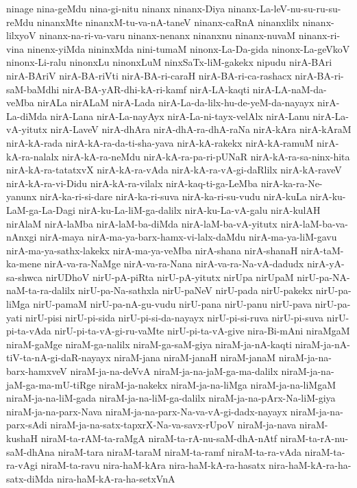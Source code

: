 {ninage
nina-geMdu
nina-gi-nitu
ninanx
ninanx-Diya
ninanx-La-leV-nu-su-ru-su-reMdu
ninanxMte
ninanxM-tu-va-nA-taneV
ninanx-caRnA
ninanxlilx
ninanx-lilxyoV
ninanx-na-ri-va-varu
ninanx-nenanx
ninanxnu
ninanx-nuvaM
ninanx-ri-vina
ninenx-yiMda
nininxMda
nini-tumaM
ninonx-La-Da-gida
ninonx-La-geVkoV
ninonx-Li-ralu
ninonxLu
ninonxLuM
ninxSaTx-liM-gakekx
nipudu
nirA-BAri
nirA-BAriV
nirA-BA-riVti
nirA-BA-ri-caraH
nirA-BA-ri-ca-rashacx
nirA-BA-ri-saM-baMdhi
nirA-BA-yAR-dhi-kA-ri-kamf
nirA-LA-kaqti
nirA-LA-naM-da-veMba
nirALa
nirALaM
nirA-Lada
nirA-La-da-lilx-hu-de-yeM-da-nayayx
nirA-La-diMda
nirA-Lana
nirA-La-nayAyx
nirA-La-ni-tayx-velAlx
nirA-Lanu
nirA-La-vA-yitutx
nirA-LaveV
nirA-dhAra
nirA-dhA-ra-dhA-raNa
nirA-kAra
nirA-kAraM
nirA-kA-rada
nirA-kA-ra-da-ti-sha-yava
nirA-kA-rakekx
nirA-kA-ramuM
nirA-kA-ra-nalalx
nirA-kA-ra-neMdu
nirA-kA-ra-pa-ri-pUNaR
nirA-kA-ra-sa-ninx-hita
nirA-kA-ra-tatatxvX
nirA-kA-ra-vAda
nirA-kA-ra-vA-gi-daRlilx
nirA-kA-raveV
nirA-kA-ra-vi-Didu
nirA-kA-ra-vilalx
nirA-kaq-ti-ga-LeMba
nirA-ka-ra-Ne-yanunx
nirA-ka-ri-si-dare
nirA-ka-ri-suva
nirA-ka-ri-su-vudu
nirA-kuLa
nirA-ku-LaM-ga-La-Dagi
nirA-ku-La-liM-ga-dalilx
nirA-ku-La-vA-galu
nirA-kulAH
nirAlaM
nirA-laMba
nirA-laM-ba-diMda
nirA-laM-ba-vA-yitutx
nirA-laM-ba-va-nAnxgi
nirA-maya
nirA-ma-ya-barx-hamx-vi-lalx-daMdu
nirA-ma-ya-liM-gavu
nirA-ma-ya-sathx-lakekx
nirA-ma-ya-veMba
nirA-shana
nirA-shanaH
nirA-taM-ka-mene
nirA-va-ra-NaMge
nirA-va-ra-Nana
nirA-va-ra-Na-vA-dadudx
nirA-yA-sa-shwca
nirUDhoV
nirU-pA-piRta
nirU-pA-yitutx
nirUpa
nirUpaM
nirU-pa-NA-naM-ta-ra-dalilx
nirU-pa-Na-sathxla
nirU-paNeV
nirU-pada
nirU-pakekx
nirU-pa-liMga
nirU-pamaM
nirU-pa-nA-gu-vudu
nirU-pana
nirU-panu
nirU-pava
nirU-pa-yati
nirU-pisi
nirU-pi-sida
nirU-pi-si-da-nayayx
nirU-pi-si-ruva
nirU-pi-suva
nirU-pi-ta-vAda
nirU-pi-ta-vA-gi-ru-vaMte
nirU-pi-ta-vA-give
nira-Bi-mAni
niraMgaM
niraM-gaMge
niraM-ga-nalilx
niraM-ga-saM-giya
niraM-ja-nA-kaqti
niraM-ja-nA-tiV-ta-nA-gi-daR-nayayx
niraM-jana
niraM-janaH
niraM-janaM
niraM-ja-na-barx-hamxveV
niraM-ja-na-deVvA
niraM-ja-na-jaM-ga-ma-dalilx
niraM-ja-na-jaM-ga-ma-mU-tiRge
niraM-ja-nakekx
niraM-ja-na-liMga
niraM-ja-na-liMgaM
niraM-ja-na-liM-gada
niraM-ja-na-liM-ga-dalilx
niraM-ja-na-pArx-Na-liM-giya
niraM-ja-na-parx-Nava
niraM-ja-na-parx-Na-va-vA-gi-dadx-nayayx
niraM-ja-na-parx-sAdi
niraM-ja-na-satx-tapxrX-Na-va-savx-rUpoV
niraM-ja-nava
niraM-kushaH
niraM-ta-rAM-ta-raMgA
niraM-ta-rA-nu-saM-dhA-nAtf
niraM-ta-rA-nu-saM-dhAna
niraM-tara
niraM-taraM
niraM-ta-ramf
niraM-ta-ra-vAda
niraM-ta-ra-vAgi
niraM-ta-ravu
nira-haM-kAra
nira-haM-kA-ra-hasatx
nira-haM-kA-ra-ha-satx-diMda
nira-haM-kA-ra-ha-setxVnA
}
